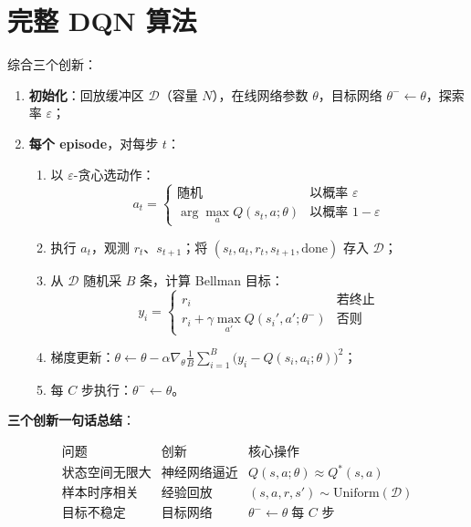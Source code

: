 \documentclass{article}
\begin{document}
\section*{完整 DQN 算法}

综合三个创新：

\begin{enumerate}
  \item \textbf{初始化}：回放缓冲区 $\mathcal{D}$（容量 $N$），在线网络参数 $\theta$，目标网络 $\theta^- \leftarrow \theta$，探索率 $\varepsilon$；
  \item \textbf{每个 episode}，对每步 $t$：
  \begin{enumerate}
    \item 以 $\varepsilon$-贪心选动作：
          \[a_t = \begin{cases} \text{随机} & \text{以概率 } \varepsilon \\ \arg\max_{a} Q(s_t, a;\theta) & \text{以概率 } 1-\varepsilon \end{cases}\]
    \item 执行 $a_t$，观测 $r_t$、$s_{t+1}$；将 $(s_t, a_t, r_t, s_{t+1}, \mathrm{done})$ 存入 $\mathcal{D}$；
    \item 从 $\mathcal{D}$ 随机采 $B$ 条，计算 Bellman 目标：
          \[y_i = \begin{cases} r_i & \text{若终止} \\ r_i + \gamma \max_{a'} Q(s_i', a';\theta^-) & \text{否则} \end{cases}\]
    \item 梯度更新：$\displaystyle\theta \leftarrow \theta - \alpha \nabla_\theta \frac{1}{B}\sum_{i=1}^B \bigl(y_i - Q(s_i, a_i;\theta)\bigr)^2$；
    \item 每 $C$ 步执行：$\theta^- \leftarrow \theta$。
  \end{enumerate}
\end{enumerate}

\textbf{三个创新一句话总结}：

\[
\begin{array}{l|l|l}
\textbf{问题} & \textbf{创新} & \textbf{核心操作} \\
\hline
\text{状态空间无限大} & \text{神经网络逼近} & Q(s,a;\theta) \approx Q^*(s,a) \\[4pt]
\text{样本时序相关} & \text{经验回放} & (s,a,r,s') \sim \mathrm{Uniform}(\mathcal{D}) \\[4pt]
\text{目标不稳定} & \text{目标网络} & \theta^- \leftarrow \theta \;\text{每 } C \text{ 步}\\
\end{array}
\]
\end{document}

